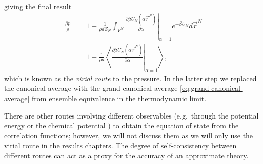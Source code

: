giving the final result
\begin{equation}\label{eq:virial-route-pressure}
  \begin{split}
    \frac{\beta p}{\rho}
    &=
    1
    -
    \frac{1}{\rho d Z_N}
    \int_{V^N}
    \left.
    \frac{\partial \beta U_N(\alpha \vec{r}^N)}{\partial \alpha}
    \right|_{\alpha = 1}
    e^{-\beta U_N}
    d\vec{r}^N
    \\ &=
    1
    -
    \frac{1}{\rho d}
    \left\langle
    \left.
    \frac{\partial \beta U_N(\alpha \vec{r}^N)}{\partial \alpha}
    \right|_{\alpha = 1}
    \right\rangle,
  \end{split}
\end{equation}
which is known as the \emph{virial route}%
to the pressure.
In the latter step we replaced the canonical average with the grand-canonical average \eqref{eq:grand-canonical-average} from ensemble equivalence in the thermodynamic limit.

There are other routes involving different observables (e.g.\ through the potential energy or the chemical potential \cite{Santos2016}) to obtain the equation of state from the correlation functions; however, we will not discuss them as we will only use the virial route in the results chapters.
The degree of self-consistency between different routes can act as a proxy for the accuracy of an approximate theory.

\vspace{0.5em}


